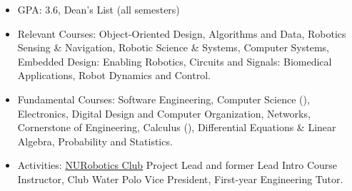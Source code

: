 \documentclass[10pt,a4paper,ragged2e,withhyper]{altacv}
\newcommand{\rom}[1]{\uppercase\expandafter{\romannumeral #1\relax}}
\begin{document}
\vspace{-2em}
\begin{paracol}{2}

    \begin{itemize}
        \item GPA: 3.6, Dean's List (all semesters)
        \item Relevant Courses: Object-Oriented Design, Algorithms and Data, Robotics Sensing \& Navigation, Robotic Science \& Systems, Computer Systems, Embedded Design: Enabling Robotics, Circuits and Signals: Biomedical Applications, Robot Dynamics and Control.
        \item Fundamental Courses: Software Engineering, Computer Science (\rom{2}), Electronics, Digital Design and Computer Organization, Networks, Cornerstone of Engineering, Calculus (\rom{3}), Differential Equations \& Linear Algebra, Probability and Statistics.
        \item Activities: \href{https://web.northeastern.edu/nurobotics/}{NURobotics Club} Project Lead and former Lead Intro Course Instructor, Club Water Polo Vice President, First-year Engineering Tutor.
    \end{itemize}



\end{paracol}
\end{document}
